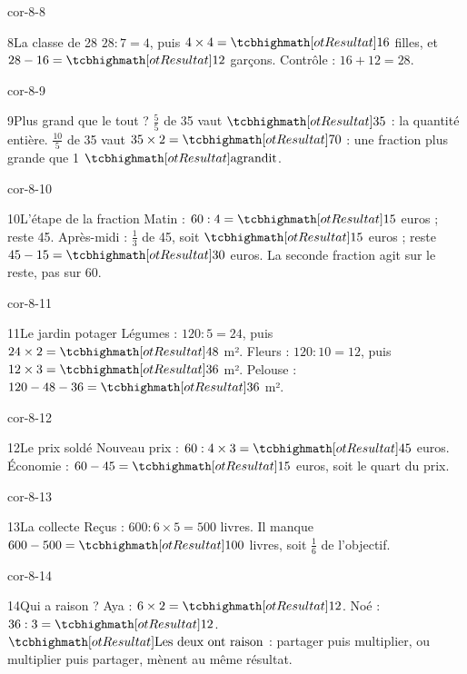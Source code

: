 \begin{blocLivre}{cor-8-8}\begin{corrige}{8}{La classe de 28}
$28:7=4$, puis $4\times4=\res{16}$ filles, et $28-16=\res{12}$ garçons. Contrôle : $16+12=28$.
\end{corrige}\end{blocLivre}
\begin{blocLivre}{cor-8-9}\begin{corrige}{9}{Plus grand que le tout ?}
$\frac55$ de 35 vaut $\res{35}$ : la quantité entière. $\frac{10}5$ de 35 vaut $35\times2=\res{70}$ : une fraction plus grande que 1 $\res{\text{agrandit}}$.
\end{corrige}\end{blocLivre}
\begin{blocLivre}{cor-8-10}\begin{corrige}{10}{L’étape de la fraction}
Matin : $60:4=\res{15}$ euros ; reste 45. Après-midi : $\frac13$ de 45, soit $\res{15}$ euros ; reste $45-15=\res{30}$ euros. La seconde fraction agit sur le reste, pas sur 60.
\end{corrige}\end{blocLivre}
\begin{blocLivre}{cor-8-11}\begin{corrige}{11}{Le jardin potager}
Légumes : $120:5=24$, puis $24\times2=\res{48}$ m². Fleurs : $120:10=12$, puis $12\times3=\res{36}$ m². Pelouse : $120-48-36=\res{36}$ m².
\end{corrige}\end{blocLivre}
\begin{blocLivre}{cor-8-12}\begin{corrige}{12}{Le prix soldé}
Nouveau prix : $60:4\times3=\res{45}$ euros. Économie : $60-45=\res{15}$ euros, soit le quart du prix.
\end{corrige}\end{blocLivre}
\begin{blocLivre}{cor-8-13}\begin{corrige}{13}{La collecte}
Reçus : $600:6\times5=500$ livres. Il manque $600-500=\res{100}$ livres, soit $\frac16$ de l’objectif.
\end{corrige}\end{blocLivre}
\begin{blocLivre}{cor-8-14}\begin{corrige}{14}{Qui a raison ?}
Aya : $6\times2=\res{12}$. Noé : $36:3=\res{12}$. $\res{\text{Les deux ont raison}}$ : partager puis multiplier, ou multiplier puis partager, mènent au même résultat.
\end{corrige}\end{blocLivre}
